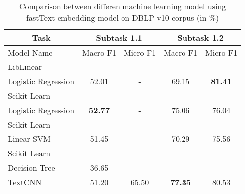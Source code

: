 \begin{table}[htbp!] %
    \centering
    \begin{tabular}{lcccc}
    \toprule
        \multicolumn{1}{c}{Task}           & \multicolumn{2}{c}{Subtask 1.1}    & \multicolumn{2}{c}{Subtask 1.2}    \\
    \midrule
        Model Name                         & Macro-F1         & Micro-F1        & Macro-F1         & Micro-F1        \\
    \midrule
        LibLinear\\ Logistic Regression    & 52.01            & -               & 69.15            & \bf81.41        \\
        Scikit Learn\\ Logistic Regression & \bf52.77         & -               & 75.06            & 76.04           \\
        Scikit Learn\\ Linear SVM          & 51.45            & -               & 70.29            & 75.56           \\
        Scikit Learn\\ Decision Tree       & 36.65            & -               & -                & -               \\
        TextCNN                            & 51.20            & 65.50           & \bf77.35         & 80.53           \\
    \bottomrule
    \end{tabular}
\caption{Comparison between differen machine learning model using fastText embedding model on DBLP v10 corpus (in \%)}
\label{tab:model}
\end{table}
